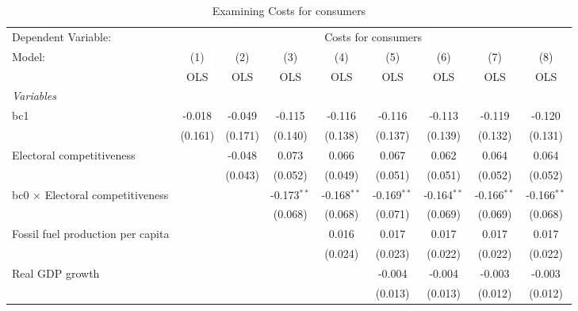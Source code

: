 
\begin{table}[htbp]
   \caption{Examining Costs for consumers}
   \centering
   \begin{tabular}{lcccccccc}
      \toprule
      Dependent Variable: & \multicolumn{8}{c}{Costs for consumers}\\
      Model:                                  & (1)     & (2)     & (3)           & (4)           & (5)           & (6)           & (7)           & (8)\\  
                                              &  OLS    & OLS     & OLS           & OLS           & OLS           & OLS           & OLS           & OLS\\  
      \midrule
      \emph{Variables}\\
      bc1                                     & -0.018  & -0.049  & -0.115        & -0.116        & -0.116        & -0.113        & -0.119        & -0.120\\   
                                              & (0.161) & (0.171) & (0.140)       & (0.138)       & (0.137)       & (0.139)       & (0.132)       & (0.131)\\   
      Electoral competitiveness               &         & -0.048  & 0.073         & 0.066         & 0.067         & 0.062         & 0.064         & 0.064\\   
                                              &         & (0.043) & (0.052)       & (0.049)       & (0.051)       & (0.051)       & (0.052)       & (0.052)\\   
      bc0 $\times$ Electoral competitiveness  &         &         & -0.173$^{**}$ & -0.168$^{**}$ & -0.169$^{**}$ & -0.164$^{**}$ & -0.166$^{**}$ & -0.166$^{**}$\\   
                                              &         &         & (0.068)       & (0.068)       & (0.071)       & (0.069)       & (0.069)       & (0.068)\\   
      Fossil fuel production per capita       &         &         &               & 0.016         & 0.017         & 0.017         & 0.017         & 0.017\\   
                                              &         &         &               & (0.024)       & (0.023)       & (0.022)       & (0.022)       & (0.022)\\   
      Real GDP growth                         &         &         &               &               & -0.004        & -0.004        & -0.003        & -0.003\\   
                                              &         &         &               &               & (0.013)       & (0.013)       & (0.012)       & (0.012)\\   

\end{tabular}
\end{table}
